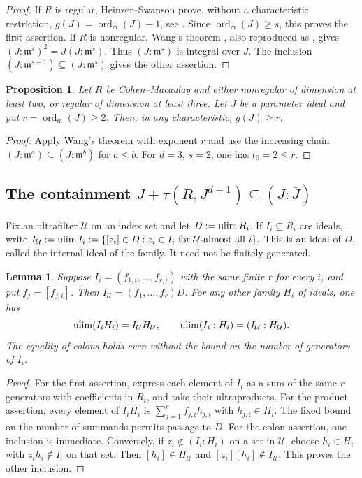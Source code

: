 \documentclass[11pt,a4paper]{amsart}
\numberwithin{equation}{section}
\newtheorem{proposition}[theorem]{Proposition}
\newtheorem{lemma}[theorem]{Lemma}
\newcommand{\U}{\mathcal{U}}
\newcommand{\m}{\mathfrak m}
\newcommand{\ord}{\operatorname{ord}}
\newcommand{\cl}[1]{\overline{#1}}
\begin{document}
 \begin{proof}
 	If $R$ is regular, Heinzer--Swanson prove, without a
 	characteristic restriction,
 	$g(J)=\ord_\m(J)-1$, see
 	\cite[Theorem 2.2]{HS}.
 	Since $\ord_\m(J)\geq s$, this proves the first assertion.
 	If $R$ is nonregular, Wang's theorem
 	\cite[Theorems 1.1--1.2]{Wang}, also reproduced as
 	\cite[Theorem 1.1]{WY}, gives
 	$(J:\m^s)^2=J(J:\m^s).$
 	Thus $(J:\m^s)$ is integral over $J$.
 	The inclusion $(J:\m^{s-1})\subseteq (J:\m^s)$ gives the other
 	assertion.
 \end{proof}
 
 \begin{proposition} 
 	\label{prop:wangrange}
 	Let $R$ be Cohen--Macaulay and either nonregular of dimension
 	at least two, or regular of dimension at least three.
 	Let $J$ be a parameter ideal and put
 	$r=\ord_\m(J)\geq2$.  Then, in any characteristic,
 	$	g(J)\geq r.$
 \end{proposition}
 \begin{proof}
 	Apply Wang's theorem with exponent $r$ and use the increasing
 	chain $(J:\m^a)\subseteq (J:\m^b)$ for $a\leq b$.
 	For $d=3$, $s=2$, one has $t_0=2\leq r$.
 \end{proof}
 
 \subsection{The containment $J+\tau(R,J^{d-1})\subseteq( J:\cl J)$} 

\begin{notation} Fix an ultrafilter $\U$ on an index set and let $D:=\operatorname*{ulim} R_i$.
 If $I_i\subseteq R_i$ are ideals, write
 $I_{\U}:=\ulim I_i
 :=\{[z_i]\in D:z_i\in I_i\text{ for $\U$-almost all }i\}.$
 This is an ideal of $D$, called the internal ideal of the family.
 It need not be finitely generated.\end{notation}
 
 \begin{lemma}\label{lem:internal}
 	Suppose $I_i=(f_{1,i},\ldots,f_{r,i})$ with the same finite $r$
 	for every $i$, and put $f_j=[f_{j,i}]$. Then
 $I_{\U}=(f_1,\ldots,f_r)D.$
 	For any other family $H_i$ of ideals, one has
 	$$	\ulim(I_iH_i)=I_{\U}H_{\U},\qquad
 	\ulim(I_i:H_i)=(I_{\U}:H_{\U}). 	$$
 	The equality of colons holds even without the bound on the
 	number of generators of $I_i$.
 \end{lemma}
 
 \begin{proof}
 	For the first assertion, express each element of $I_i$ as a sum
 	of the same $r$ generators with coefficients in $R_i$, and take
 	their ultraproducts. For the product assertion, every element of
 	$I_iH_i$ is $\sum_{j=1}^r f_{j,i}h_{j,i}$ with $h_{j,i}\in H_i$.
 	The fixed bound on the number of summands permits passage to $D$.
 	For the colon assertion, one inclusion is immediate. Conversely,
 	if $z_i\notin(I_i:H_i)$ on a set in $\U$, choose $h_i\in H_i$
 	with $z_ih_i\notin I_i$ on that set. Then $[h_i]\in H_{\U}$
 	and $[z_i][h_i]\notin I_{\U}$. This proves the other inclusion.
 \end{proof}
 
\end{document}
